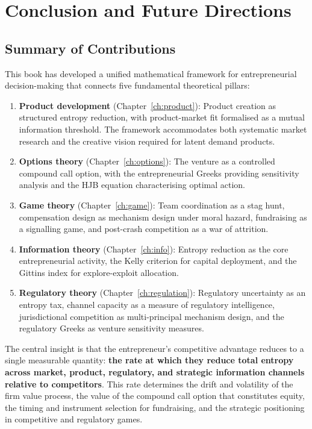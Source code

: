 \documentclass[12pt,a4paper,oneside]{book}
\theoremstyle{definition}
\theoremstyle{remark}
\begin{document}
\chapter{Conclusion and Future Directions}\label{ch:conclusion}

\section{Summary of Contributions}

This book has developed a unified mathematical framework for entrepreneurial
decision-making that connects five fundamental theoretical pillars:

\begin{enumerate}
  \item \textbf{Product development} (Chapter~\ref{ch:product}): Product creation as
    structured entropy reduction, with product-market fit formalised as a mutual
    information threshold. The framework accommodates both systematic market research
    and the creative vision required for latent demand products.
  \item \textbf{Options theory} (Chapter~\ref{ch:options}): The venture as a
    controlled compound call option, with the entrepreneurial Greeks providing
    sensitivity analysis and the HJB equation characterising optimal action.
  \item \textbf{Game theory} (Chapter~\ref{ch:game}): Team coordination as a stag
    hunt, compensation design as mechanism design under moral hazard, fundraising as
    a signalling game, and post-crash competition as a war of attrition.
  \item \textbf{Information theory} (Chapter~\ref{ch:info}): Entropy reduction as the
    core entrepreneurial activity, the Kelly criterion for capital deployment, and
    the Gittins index for explore-exploit allocation.
  \item \textbf{Regulatory theory} (Chapter~\ref{ch:regulation}): Regulatory
    uncertainty as an entropy tax, channel capacity as a measure of regulatory
    intelligence, jurisdictional competition as multi-principal mechanism design,
    and the regulatory Greeks as venture sensitivity measures.
\end{enumerate}

The central insight is that the entrepreneur's competitive advantage reduces to a
single measurable quantity: \textbf{the rate at which they reduce total entropy across
market, product, regulatory, and strategic information channels relative to
competitors}. This rate determines the drift and volatility of the firm value process,
the value of the compound call option that constitutes equity, the timing and instrument
selection for fundraising, and the strategic positioning in competitive and regulatory
games.
\end{document}

